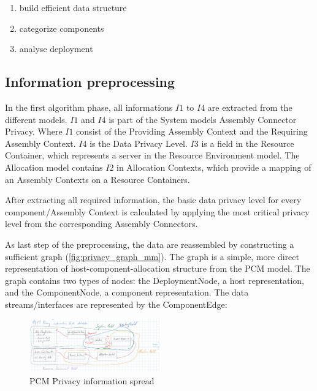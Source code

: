 \begin{enumerate}
	\label{enum:algorithm_steps}
	\setlength\itemsep{0em}
	\item build efficient data structure
	\item categorize components
	\item analyse deployment
\end{enumerate}


\subsection{Information preprocessing}
\label{sec:PrivacyAnalysis:implementation:prepro}

In the first algorithm phase, all informations $I1$ to $I4$ are extracted from the different models. $I1$ and $I4$ is part of the System models Assembly Connector Privacy. Where $I1$ consist of the Providing Assembly Context and the Requiring Assembly Context. $I4$ is the Data Privacy Level. $I3$ is a field in the Resource Container, which represents a server in the Resource Environment model. The Allocation model contains $I2$ in Allocation Contexts, which provide a mapping of an Assembly Contexts on a Resource Containers.

After extracting all required information, the basic data privacy level for every component/Assembly Context is calculated by applying the most critical privacy level from the corresponding Assembly Connectors.

As last step of the preprocessing, the data are reassembled by constructing a sufficient graph (\autoref{fig:privacy_graph_mm}). The graph is a simple, more direct representation of host-component-allocation structure from the PCM model. The graph contains two types of nodes: the DeploymentNode, a host representation, and the ComponentNode, a component representation. The data streams/interfaces are represented by the ComponentEdge:

\begin{figure}[h]
	\centering
	\includegraphics[width=0.5\textwidth]{pictures/pcm_info_spread}
	\caption{PCM Privacy information spread}
	\label{fig:pcm_info_spread}
\end{figure}

